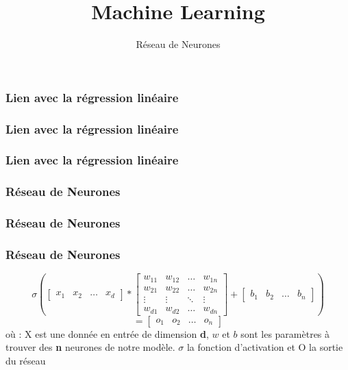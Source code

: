 \documentclass{formation}
\title{Machine Learning}
\subtitle{Réseau de Neurones}
\begin{document}
\maketitle

\begin{frame}
  \frametitle{Lien avec la régression linéaire}
\end{frame}

\begin{frame}
  \frametitle{Lien avec la régression linéaire}
\end{frame}

\begin{frame}
  \frametitle{Lien avec la régression linéaire}
\end{frame}

\begin{frame}
  \frametitle{Réseau de Neurones}
\end{frame}

\begin{frame}
  \frametitle{Réseau de Neurones}
\end{frame}

\begin{frame}
  \frametitle{Réseau de Neurones}
  \[
  \sigma \left(
  \begin{bmatrix}
    x_{1} & x_{2} & \dots & x_{d}
  \end{bmatrix}
  *
  \begin{bmatrix}
    w_{11} & w_{12} & \dots  & w_{1n} \\
    w_{21} & w_{22} & \dots  & w_{2n} \\
    \vdots & \vdots & \ddots & \vdots \\
    w_{d1} & w_{d2} & \dots  & w_{dn}
  \end{bmatrix}
  +
  \begin{bmatrix}
    b_{1} & b_{2} & \dots & b_{n}
  \end{bmatrix}
  \right )
  \]
  \[
  =
  \begin{bmatrix}
    o_{1} & o_{2} & \dots & o_{n}
  \end{bmatrix}
  \]
  \newline
  où :
  \newline
  X est une donnée en entrée de dimension \textbf{d},
  \newline
  $w$ et $b$ sont les paramètres à trouver des \textbf{n} neurones de notre modèle.
  \newline
  $\sigma$ la fonction d'activation et
  \newline
  O la sortie du réseau
\end{frame}
\end{document}
